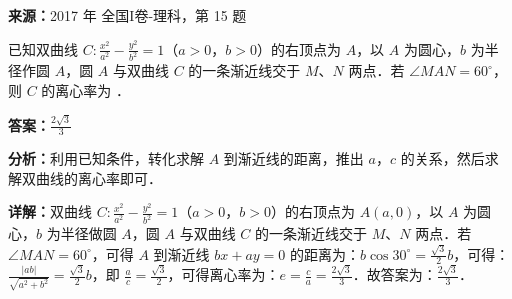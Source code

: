 \begin{question}[points=5]
\textbf{来源：}2017 年 全国I卷-理科，第 15 题\par
已知双曲线 $C:\frac{x^2}{a^2}-\frac{y^2}{b^2}=1$（$a>0$，$b>0$）的右顶点为 $A$，以 $A$ 为圆心，$b$ 为半径作圆 $A$，圆 $A$ 与双曲线 $C$ 的一条渐近线交于 $M$、$N$ 两点．若 $\angle MAN=60^\circ$，则 $C$ 的离心率为 ．
\begin{solution}
\textbf{答案：}$\frac{2\sqrt{3}}{3}$

\textbf{分析：}利用已知条件，转化求解 $A$ 到渐近线的距离，推出 $a$，$c$ 的关系，然后求解双曲线的离心率即可．

\textbf{详解：}双曲线 $C:\frac{x^2}{a^2}-\frac{y^2}{b^2}=1$（$a>0$，$b>0$）的右顶点为 $A(a,0)$，以 $A$ 为圆心，$b$ 为半径做圆 $A$，圆 $A$ 与双曲线 $C$ 的一条渐近线交于 $M$、$N$ 两点．若 $\angle MAN=60^\circ$，可得 $A$ 到渐近线 $bx+ay=0$ 的距离为：$b\cos30^\circ=\frac{\sqrt{3}}{2}b$，可得：$\frac{|ab|}{\sqrt{a^2+b^2}}=\frac{\sqrt{3}}{2}b$，即 $\frac{a}{c}=\frac{\sqrt{3}}{2}$，可得离心率为：$e=\frac{c}{a}=\frac{2\sqrt{3}}{3}$．故答案为：$\frac{2\sqrt{3}}{3}$．
\end{solution}
\end{question}

